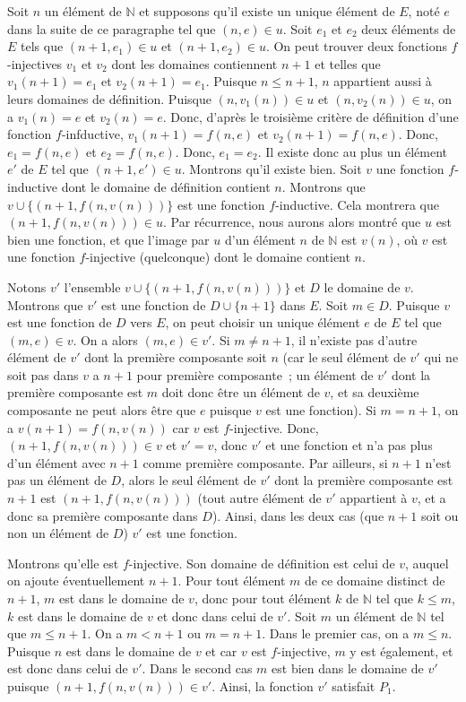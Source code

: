 Soit $n$ un élément de $\mathbb{N}$ et supposons qu'il existe un unique élément de $E$, noté $e$ dans la suite de ce paragraphe tel que $(n,e) \in u$. 
Soit $e_1$ et $e_2$ deux éléments de $E$ tels que $(n+1, e_1) \in u$ et $(n+1, e_2) \in u$. 
On peut trouver deux fonctions $f$-injectives $v_1$ et $v_2$ dont les domaines contiennent $n+1$ et telles que $v_1(n+1) = e_1$ et $v_2(n+1) = e_1$. 
Puisque $n \leq n+1$, $n$ appartient aussi à leurs domaines de définition. 
Puisque $(n, v_1(n)) \in u$ et $(n, v_2(n)) \in u$, on a $v_1(n) = e$ et $v_2(n) = e$. 
Donc, d'après le troisième critère de définition d'une fonction $f$-infductive, $v_1(n+1) = f(n,e)$ et $v_2(n+1) = f(n,e)$.
Donc, $e_1 = f(n,e)$ et $e_2 = f(n,e)$. 
Donc, $e_1 = e_2$. 
Il existe donc au plus un élément $e'$ de $E$ tel que $(n+1, e') \in u$. 
Montrons qu'il existe bien. 
Soit $v$ une fonction $f$-inductive dont le domaine de définition contient $n$. 
Montrons que $v \cup \lbrace (n+1, f(n, v(n))) \rbrace$ est une fonction $f$-inductive. 
Cela montrera que $(n+1, f(n,v(n))) \in u$. 
Par récurrence, nous aurons alors montré que $u$ est bien une fonction, et que l'image par $u$ d'un élément $n$ de $\mathbb{N}$ est $v(n)$, où $v$ est une fonction $f$-injective (quelconque) dont le domaine contient $n$. 

Notons $v'$ l'ensemble $v \cup \lbrace (n+1, f(n, v(n))) \rbrace$ et $D$ le domaine de $v$. 
Montrons que $v'$ est une fonction de $D \cup \lbrace n+1 \rbrace$ dans $E$. 
Soit $m \in D$. 
Puisque $v$ est une fonction de $D$ vers $E$, on peut choisir un unique élément $e$ de $E$ tel que $(m,e) \in v$. 
On a alors $(m,e) \in v'$.
Si $m \neq n+1$, il n'existe pas d'autre élément de $v'$ dont la première composante soit $n$ (car le seul élément de $v'$ qui ne soit pas dans $v$ a $n+1$ pour première composante ; un élément de $v'$ dont la première composante est $m$ doit donc être un élément de $v$, et sa deuxième composante ne peut alors être que $e$ puisque $v$ est une fonction). 
Si $m = n+1$, on a $v(n+1) = f(n, v(n))$ car $v$ est $f$-injective. 
Donc, $(n+1, f(n,v(n))) \in v$ et $v' = v$, donc $v'$ et une fonction et n'a pas plus d'un élément avec $n+1$ comme première composante.
Par ailleurs, si $n+1$ n'est pas un élément de $D$, alors le seul élément de $v'$ dont la première composante est $n+1$ est $(n+1,f(n,v(n)))$ (tout autre élément de $v'$ appartient à $v$, et a donc sa première composante dans $D$).
Ainsi, dans les deux cas (que $n+1$ soit ou non un élément de $D$) $v'$ est une fonction. 

Montrons qu'elle est $f$-injective. 
Son domaine de définition est celui de $v$, auquel on ajoute éventuellement $n+1$. 
Pour tout élément $m$ de ce domaine distinct de $n+1$, $m$ est dans le domaine de $v$, donc pour tout élément $k$ de $\mathbb{N}$ tel que $k \leq m$, $k$ est dans le domaine de $v$ et donc dans celui de $v'$. 
Soit $m$ un élément de $\mathbb{N}$ tel que $m \leq n+1$. 
On a $m < n + 1$ ou $m = n + 1$.
Dans le premier cas, on a $m \leq n$. 
Puisque $n$ est dans le domaine de $v$ et car $v$ est $f$-injective, $m$ y est également, et est donc dans celui de $v'$.
Dans le second cas $m$ est bien dans le domaine de $v'$ puisque $(n+1, f(n,v(n))) \in v'$. 
Ainsi, la fonction $v'$ satisfait $P_1$.

